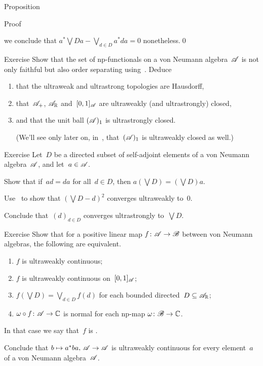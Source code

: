 \documentclass[a]{subfiles}
\begin{document}
\begin{parsec}
\begin{point}[ad-normal]{Proposition}
\begin{point}[ad-normal-1]{Proof}
\begin{point}
we conclude that
$a^*\bigvee D a  
- \bigvee_{d\in D} a^* d a =0$
nonetheless.\qed
\end{point}
\end{point}
\end{point}
\begin{point}{Exercise}%
Show that the set of np-functionals
on a von Neumann algebra~$\mathscr{A}$
is not only faithful 
but also order separating
using~.
Deduce
\begin{enumerate}%
\item
that the ultraweak and ultrastrong topologies
are Hausdorff,
\item
that~$\mathscr{A}_+$, 
$\mathscr{A}_{\mathbb{R}}$ and~$[0,1]_{\mathscr{A}}$  are ultraweakly 
(and ultrastrongly) closed, 
\item
and that the unit ball
$(\mathscr{A})_1$
is ultrastrongly closed.

(We'll see only later on, in~,
that~$(\mathscr{A})_1$
is ultraweakly closed as well.)
\end{enumerate}
\end{point}
\begin{point}{Exercise}%
Let~$D$ be a directed subset of self-adjoint elements
of a von Neumann algebra~$\mathscr{A}$,
and let~$a\in\mathscr{A}$.
\begin{point}%
Show that if~$ad=da$ for all~$d\in D$,
then $a(\bigvee D) = (\bigvee D)a $.
\end{point}
\begin{point}%
Use~
to show that $(\bigvee D-d)^2$ converges ultraweakly to~$0$.

Conclude that~$(d)_{d\in D}$ converges ultrastrongly to~$\bigvee D$.
\end{point}
\end{point}
\begin{point}[p-uwcont]{Exercise}%
Show that for a positive linear map $f\colon \mathscr{A}\to\mathscr{B}$
between von Neumann algebras,
the following are equivalent.
\begin{enumerate}
\item
$f$ is ultraweakly continuous;
\item
$f$ is ultraweakly continuous on~$[0,1]_{\mathscr{A}}$;
\item
$f(\bigvee D)=\bigvee_{d\in D}f(d)$ for each bounded 
directed~$D\subseteq\mathscr{A}_{\mathbb{R}}$;
\item 
$\omega\circ f\colon \mathscr{A}\to\mathbb{C}$ is normal 
for each np-map $\omega\colon \mathscr{B}\to\mathbb{C}$.
\end{enumerate}
In that case we say that~$f$ is .

Conclude that $b\mapsto a^*ba,\,\mathscr{A}\to\mathscr{A}$
is ultraweakly
continuous for every element~$a$ of a von Neumann 
algebra~$\mathscr{A}$.
\end{point}
\end{parsec}
\end{document}
